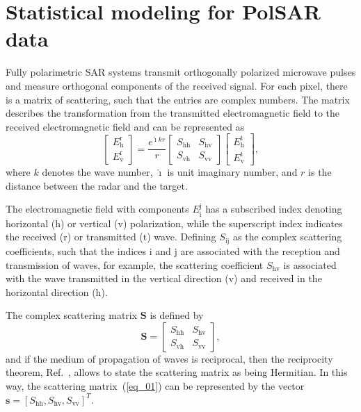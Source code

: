 \documentclass[conference]{IEEEtran}
\begin{document}
\section{Statistical modeling for PolSAR data}\label{sec_02}

Fully polarimetric SAR systems transmit orthogonally polarized microwave pulses and measure orthogonal components of the received signal. For each pixel, there is a matrix of scattering, such that the entries are complex numbers. The matrix describes the transformation from the transmitted electromagnetic field to the received electromagnetic field and can be represented as
\begin{equation*}
 \left[
\begin{array}{c}
	E_{\text{h}}^{\text{r}}   \\
	E_{\text{v}}^{\text{r}}    
\end{array}
\right]
 = \frac{e^{\hat{\imath} kr}}{r}\left[
\begin{array}{cc}
	S_\text{hh}   & S_\text{hv}   \\
	S_\text{vh}   & S_\text{vv}   
\end{array}
\right]
 \left[
\begin{array}{c}
	E_{\text{h}}^{\text{t}}   \\
	E_{\text{v}}^{\text{t}}    
\end{array}
\right],
\end{equation*}
where $k$ denotes the wave number, $\hat{\imath}$ is unit imaginary number, and $r$ is the distance between the radar and the target. 

The electromagnetic field with components $E_{\text{i}}^{\text{j}}$ has a subscribed index denoting horizontal ($\text{h}$) or vertical ($\text{v}$) polarization, while the superscript index indicates the received ($\text{r}$) or transmitted ($\text{t}$) wave. Defining $S_\text{ij}$ as the complex scattering coefficients, such that the indices $\text{i}$ and $\text{j}$ are associated with the reception and transmission of waves, for example, the scattering coefficient $S_\text{hv}$ is associated with the wave transmitted in the vertical direction ($\text{v}$) and received in the horizontal direction ($\text{h}$).

The complex scattering matrix $\mathbf{S}$ is defined by
\begin{equation}
\mathbf{S} = \left[
\begin{array}{cc}
	S_\text{hh}   & S_\text{hv}   \\
	S_\text{vh}   & S_\text{vv}   
\end{array}
\right],
\label{eq_01}
\end{equation}
and if the medium of propagation of waves is reciprocal, then the reciprocity theorem, Ref.~\cite{lp}, allows to state the scattering matrix as being Hermitian.  In this way, the scattering matrix~(\ref{eq_01}) can be represented by the vector $\mathbf{s}=[S_\text{hh},S_\text{hv},S_{\text{vv}}]^T$.
\end{document}
